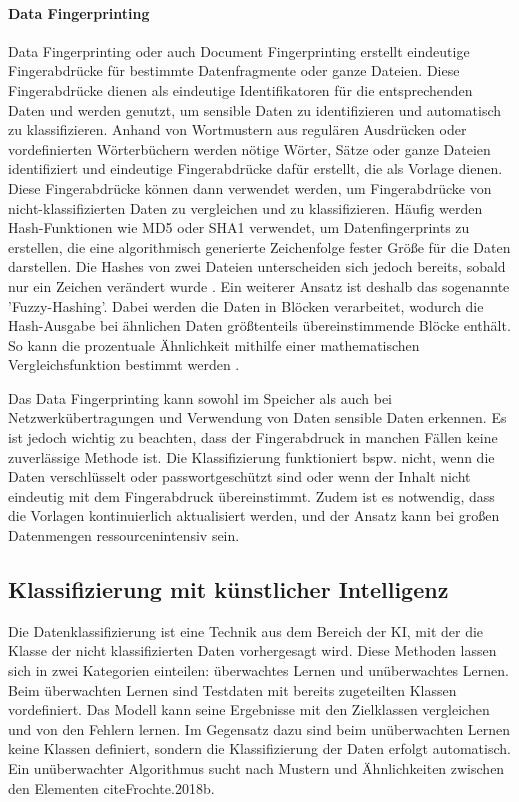 \paragraph{Data Fingerprinting} \label{fingerprint}
Data Fingerprinting oder auch Document Fingerprinting erstellt eindeutige Fingerabdrücke für bestimmte Datenfragmente oder ganze Dateien. Diese Fingerabdrücke dienen als eindeutige Identifikatoren für die entsprechenden Daten und werden genutzt, um sensible Daten zu identifizieren und automatisch zu klassifizieren. Anhand von Wortmustern aus regulären Ausdrücken oder vordefinierten Wörterbüchern werden nötige Wörter, Sätze oder ganze Dateien identifiziert und eindeutige Fingerabdrücke dafür erstellt, die als Vorlage dienen. Diese Fingerabdrücke können dann verwendet werden, um Fingerabdrücke von nicht-klassifizierten Daten zu vergleichen und zu klassifizieren.
Häufig werden Hash-Funktionen wie MD5 oder SHA1 verwendet, um Datenfingerprints zu erstellen, die eine algorithmisch generierte Zeichenfolge fester Größe für die Daten darstellen. Die Hashes von zwei Dateien unterscheiden sich jedoch bereits, sobald nur ein Zeichen verändert wurde \cite{Alneyadi.2016}. Ein weiterer Ansatz ist deshalb das sogenannte 'Fuzzy-Hashing'. Dabei werden die Daten in Blöcken verarbeitet, wodurch die Hash-Ausgabe bei ähnlichen Daten größtenteils übereinstimmende Blöcke enthält. So kann die prozentuale Ähnlichkeit mithilfe einer mathematischen Vergleichsfunktion bestimmt werden \cite{Shu.2015}.

Das Data Fingerprinting kann sowohl im Speicher als auch bei Netzwerkübertragungen und Verwendung von Daten sensible Daten erkennen. Es ist jedoch wichtig zu beachten, dass der Fingerabdruck in manchen Fällen keine zuverlässige Methode ist. Die Klassifizierung funktioniert bspw. nicht, wenn die Daten verschlüsselt oder passwortgeschützt sind oder wenn der Inhalt nicht eindeutig mit dem Fingerabdruck übereinstimmt. Zudem ist es notwendig, dass die Vorlagen kontinuierlich aktualisiert werden, und der Ansatz kann bei großen Datenmengen ressourcenintensiv sein.


\subsection{Klassifizierung mit künstlicher Intelligenz}
Die Datenklassifizierung ist eine Technik aus dem Bereich der KI, mit der die Klasse der nicht klassifizierten Daten vorhergesagt wird. Diese Methoden lassen sich in zwei Kategorien einteilen: überwachtes Lernen und unüberwachtes Lernen. Beim überwachten Lernen sind Testdaten mit bereits zugeteilten Klassen vordefiniert. Das Modell kann seine Ergebnisse mit den Zielklassen vergleichen und von den Fehlern lernen. Im Gegensatz dazu sind beim unüberwachten Lernen keine Klassen definiert, sondern die Klassifizierung der Daten erfolgt automatisch. Ein unüberwachter Algorithmus sucht nach Mustern und Ähnlichkeiten zwischen den Elementen cite{Frochte.2018b}.

